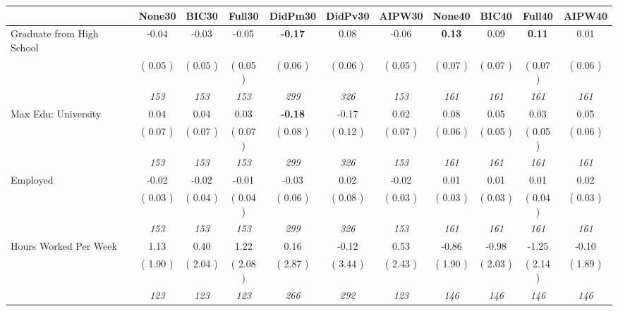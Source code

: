 \begin{tabular}{l c c c c c c c c c c}
\toprule
 & None30 & BIC30 & Full30 & DidPm30 & DidPv30 & AIPW30 & None40 & BIC40 & Full40 & AIPW40 \\
\midrule
Graduate from High School &     -0.04 &     -0.03 &     -0.05 & \textbf{     -0.17 } &      0.08 &     -0.06 & \textbf{      0.13 } &      0.09 & \textbf{      0.11 } &      0.01 \\
& (     0.05 ) & (     0.05 ) & (     0.05 ) & (     0.06 ) & (     0.06 ) & (     0.05 ) & (     0.07 ) & (     0.07 ) & (     0.07 ) & (     0.06 ) \\
& \textit{ 153 } & \textit{ 153 } & \textit{ 153 } & \textit{ 299 } & \textit{ 326 } & \textit{ 153 } & \textit{ 161 } & \textit{ 161 } & \textit{ 161 } & \textit{ 161 } \\
Max Edu: University &      0.04 &      0.04 &      0.03 & \textbf{     -0.18 } &     -0.17 &      0.02 &      0.08 &      0.05 &      0.03 &      0.05 \\
& (     0.07 ) & (     0.07 ) & (     0.07 ) & (     0.08 ) & (     0.12 ) & (     0.07 ) & (     0.06 ) & (     0.05 ) & (     0.05 ) & (     0.06 ) \\
& \textit{ 153 } & \textit{ 153 } & \textit{ 153 } & \textit{ 299 } & \textit{ 326 } & \textit{ 153 } & \textit{ 161 } & \textit{ 161 } & \textit{ 161 } & \textit{ 161 } \\
Employed &     -0.02 &     -0.02 &     -0.01 &     -0.03 &      0.02 &     -0.02 &      0.01 &      0.01 &      0.01 &      0.02 \\
& (     0.03 ) & (     0.04 ) & (     0.04 ) & (     0.06 ) & (     0.08 ) & (     0.03 ) & (     0.03 ) & (     0.03 ) & (     0.04 ) & (     0.03 ) \\
& \textit{ 153 } & \textit{ 153 } & \textit{ 153 } & \textit{ 299 } & \textit{ 326 } & \textit{ 153 } & \textit{ 161 } & \textit{ 161 } & \textit{ 161 } & \textit{ 161 } \\
Hours Worked Per Week &      1.13 &      0.40 &      1.22 &      0.16 &     -0.12 &      0.53 &     -0.86 &     -0.98 &     -1.25 &     -0.10 \\
& (     1.90 ) & (     2.04 ) & (     2.08 ) & (     2.87 ) & (     3.44 ) & (     2.43 ) & (     1.90 ) & (     2.03 ) & (     2.14 ) & (     1.89 ) \\
& \textit{ 123 } & \textit{ 123 } & \textit{ 123 } & \textit{ 266 } & \textit{ 292 } & \textit{ 123 } & \textit{ 146 } & \textit{ 146 } & \textit{ 146 } & \textit{ 146 } \\

\end{tabular}
